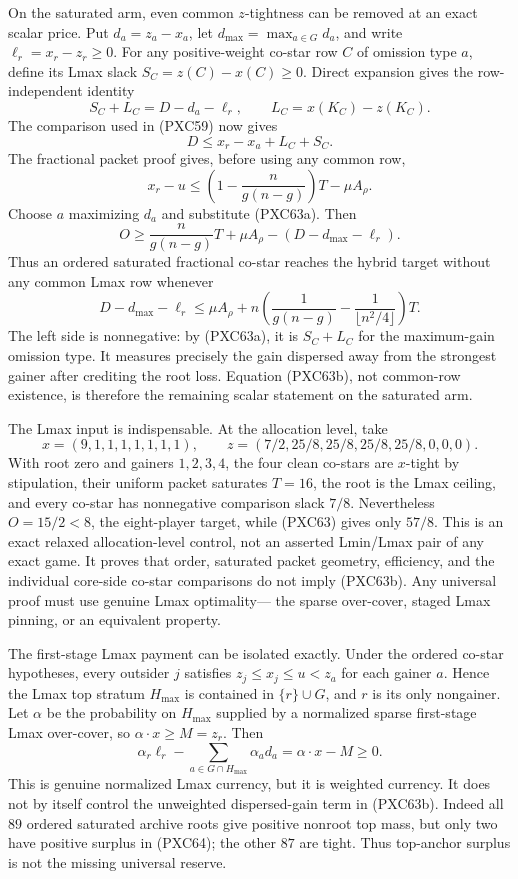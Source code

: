 \documentclass[11pt]{article}
\begin{document}
On the saturated arm, even common $z$-tightness can be removed at an exact
scalar price.  Put $d_a=z_a-x_a$, let $d_{\max}=\max_{a\in G}d_a$, and
write $\ell_r=x_r-z_r\ge0$.  For any positive-weight co-star row $C$ of
omission type $a$, define its Lmax slack $S_C=z(C)-x(C)\ge0$.  Direct
expansion gives the row-independent identity
\[
 S_C+L_C=D-d_a-\ell_r,\qquad L_C=x(K_C)-z(K_C).      \tag{PXC63a}
\]
The comparison used in (PXC59) now gives
\[
 D\le x_r-x_a+L_C+S_C.
\]
The fractional packet proof gives, before using any common row,
\[
 x_r-u\le
 \left(1-\frac{n}{g(n-g)}\right)T-\mu A_\rho.
\]
Choose $a$ maximizing $d_a$ and substitute (PXC63a).  Then
\[
 \boxed{\qquad
 O\ge \frac{n}{g(n-g)}T+\mu A_\rho-
       (D-d_{\max}-\ell_r).
 \qquad}                                             \tag{PXC63}
\]
Thus an ordered saturated fractional co-star reaches the hybrid target
without any common Lmax row whenever
\[
 D-d_{\max}-\ell_r\le \mu A_\rho+
 n\left(\frac1{g(n-g)}-
         \frac1{\lfloor n^2/4\rfloor}\right)T.       \tag{PXC63b}
\]
The left side is nonnegative: by (PXC63a), it is $S_C+L_C$ for the
maximum-gain omission type.  It measures precisely the gain dispersed away
from the strongest gainer after crediting the root loss.  Equation (PXC63b),
not common-row existence, is therefore the remaining scalar statement on
the saturated arm.

The Lmax input is indispensable.  At the allocation level, take
\[
 x=(9,1,1,1,1,1,1,1),\qquad
 z=(7/2,25/8,25/8,25/8,25/8,0,0,0).
\]
With root zero and gainers $1,2,3,4$, the four clean co-stars are
$x$-tight by stipulation, their uniform packet saturates $T=16$, the root is
the Lmax ceiling, and every co-star has nonnegative comparison slack $7/8$.
Nevertheless $O=15/2<8$, the eight-player target, while (PXC63) gives only
$57/8$.  This is an exact relaxed allocation-level control, not an asserted
Lmin/Lmax pair of any exact game.  It proves that order, saturated packet
geometry, efficiency, and the individual core-side co-star comparisons do
not imply (PXC63b).  Any universal proof must use genuine Lmax optimality---
the sparse over-cover, staged Lmax pinning, or an equivalent property.

The first-stage Lmax payment can be isolated exactly.  Under the ordered
co-star hypotheses, every outsider $j$ satisfies
$z_j\le x_j\le u<z_a$ for each gainer $a$.  Hence the Lmax top stratum
$H_{\max}$ is contained in $\{r\}\cup G$, and $r$ is its only nongainer.
Let $\alpha$ be the probability on $H_{\max}$ supplied by a normalized
sparse first-stage Lmax over-cover, so $\alpha\cdot x\ge M=z_r$.  Then
\[
 \boxed{\qquad
 \alpha_r\ell_r-
 \sum_{a\in G\cap H_{\max}}\alpha_a d_a
 =\alpha\cdot x-M\ge0.
 \qquad}                                             \tag{PXC64}
\]
This is genuine normalized Lmax currency, but it is weighted currency.  It
does not by itself control the unweighted dispersed-gain term in (PXC63b).
Indeed all $89$ ordered saturated archive roots give positive nonroot top
mass, but only two have positive surplus in (PXC64); the other $87$ are
tight.  Thus top-anchor surplus is not the missing universal reserve.
\end{document}
